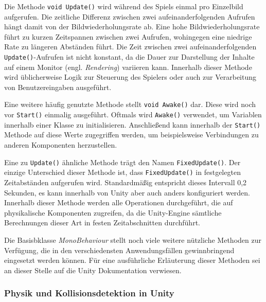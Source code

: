 Die Methode \texttt{void Update()} wird während des Spiels einmal pro Einzelbild aufgerufen. Die zeitliche Differenz zwischen zwei aufeinanderfolgenden Aufrufen hängt damit von der Bildwiederholungsrate ab. Eine hohe Bildwiederholungsrate führt zu kurzen Zeitspannen zwischen zwei Aufrufen, wohingegen eine niedrige Rate zu längeren Abständen führt. Die Zeit zwischen zwei aufeinanderfolgenden \texttt{Update()}-Aufrufen ist nicht konstant, da die Dauer zur Darstellung der Inhalte auf einem Monitor (engl. \textit{Rendering}) variieren kann. Innerhalb dieser Methode wird üblicherweise Logik zur Steuerung des Spielers oder auch zur Verarbeitung von Benutzereingaben ausgeführt.

Eine weitere häufig genutzte Methode stellt \texttt{void Awake()} dar. Diese wird noch vor \texttt{Start()} einmalig ausgeführt. Oftmals wird \texttt{Awake()} verwendet, um Variablen innerhalb einer Klasse zu initialisieren. Anschließend kann innerhalb der \texttt{Start()} Methode auf diese Werte zugegriffen werden, um beispielsweise Verbindungen zu anderen Komponenten herzustellen.

Eine zu \texttt{Update()} ähnliche Methode trägt den Namen \texttt{FixedUpdate()}. Der einzige Unterschied dieser Methode ist, dass \texttt{FixedUpdate()} in festgelegten Zeitabständen aufgerufen wird. Standardmäßig entspricht dieses Intervall 0,2 Sekunden, es kann innerhalb von Unity aber auch anders konfiguriert werden. Innerhalb dieser Methode werden alle Operationen durchgeführt, die auf physikalische Komponenten zugreifen, da die Unity-Engine sämtliche Berechnungen dieser Art in festen Zeitabschnitten durchführt.

Die Basisbklasse \textit{MonoBehaviour} stellt noch viele weitere nützliche Methoden zur Verfügung, die in den verschiedensten Anwendungsfällen gewinnbringend eingesetzt werden können. Für eine ausführliche Erläuterung dieser Methoden sei an dieser Stelle auf die Unity Dokumentation \cite{Unity_Doc_MonoBehaviour} verwiesen.

\subsubsection{Physik und Kollisionsdetektion in Unity}\label{sec:unityPhysics}

